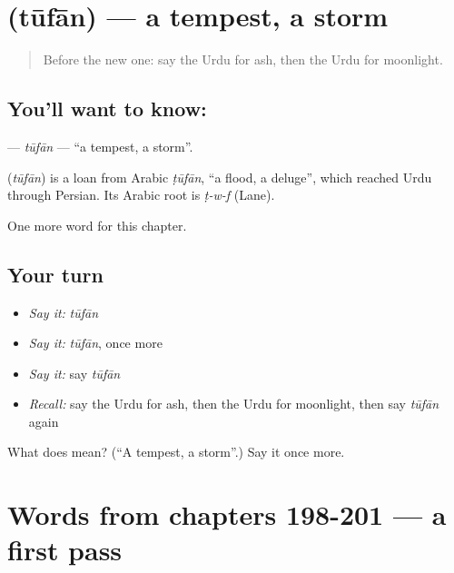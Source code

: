 \section[\texorpdfstring{\ur{طوفان} (tūfān)}{طوفان (tūfān)}]{ (tūfān) — a tempest, a storm}

\label{lesson:UR-C206-tufan}



\begin{quote}
Before the new one: say the Urdu for ash, then the Urdu for moonlight.
\end{quote}

\subsection*{You'll want to know: }
\textbf{} — \emph{tūfān} — \textquotedblleft{}a tempest, a storm\textquotedblright{}.

\begin{cousinweb}
\textbf{} (\emph{tūfān}) is a loan from Arabic \emph{ṭūfān}, \textquotedblleft{}a flood, a deluge\textquotedblright{}, which reached Urdu through Persian. Its Arabic root is \emph{ṭ-w-f} (Lane).
\end{cousinweb}

\begin{grammarlens}[title={What you've built}]
One more word for this chapter.
\end{grammarlens}

\subsection*{Your turn}
\begin{itemize}
\raggedright
  \item \emph{Say it:} \emph{tūfān}
  \item \emph{Say it:} \emph{tūfān}, once more
  \item \emph{Say it:} say \emph{tūfān}
  \item \emph{Recall:} say the Urdu for ash, then the Urdu for moonlight, then say \emph{tūfān} again
\end{itemize}

\begin{tcolorbox}[breakable,colback=teal!4,colframe=teal!35!black,title={Before you move on}]
What does  mean? (\textquotedblleft{}A tempest, a storm\textquotedblright{}.) Say it once more.
\end{tcolorbox}
\section[(dialogue)]{Words from chapters 198-201 — a first pass}

